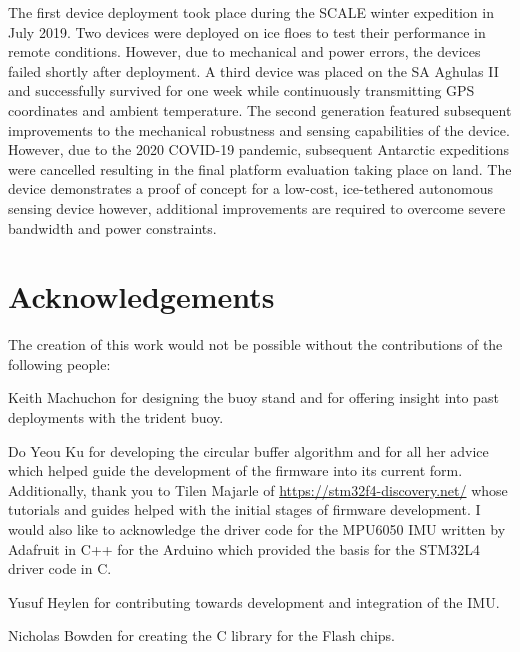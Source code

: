 \documentclass[a4paper, 12pt, oneside, openright, parskip=full]{book}
\begin{document}
The first device deployment took place during the SCALE winter expedition in July 2019. Two devices were deployed on ice floes to test their performance in remote conditions. However, due to mechanical and power errors, the devices failed shortly after deployment. A third device was placed on the SA Aghulas II and successfully survived for one week while continuously transmitting GPS coordinates and ambient temperature. The second generation featured subsequent improvements to the mechanical robustness and sensing capabilities of the device. However, due to the 2020 COVID-19 pandemic, subsequent Antarctic expeditions were cancelled resulting in the final platform evaluation taking place on land. The device demonstrates a proof of concept for a low-cost, ice-tethered autonomous sensing device however, additional improvements are required to overcome severe bandwidth and power constraints.
\chapter{Acknowledgements}		
\label{ch:ack}


The creation of this work would not be possible without the contributions of the following people:

Keith Machuchon for designing the buoy stand and for offering insight into past deployments with the trident buoy.

Do Yeou Ku for developing the circular buffer algorithm and for all her advice which helped guide the development of the firmware into its current form.  Additionally, thank you to Tilen Majarle of \url{https://stm32f4-discovery.net/} whose tutorials and guides helped with the initial stages of firmware development. I would also like to acknowledge the driver code for the MPU6050 IMU written by Adafruit in C++ for the Arduino which provided the basis for the STM32L4 driver code in C.
 
Yusuf Heylen for contributing towards development and integration of the IMU.

Nicholas Bowden for creating the C library for the Flash chips.
\end{document}
